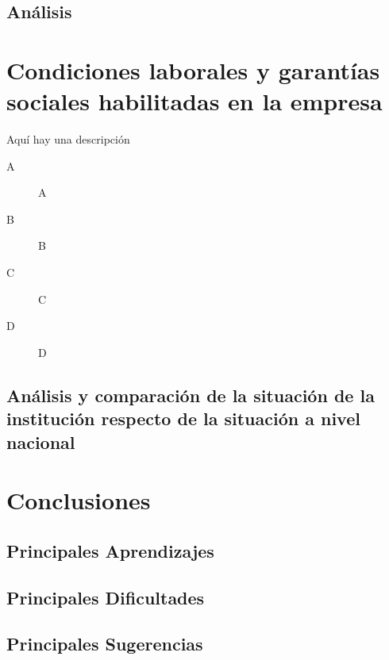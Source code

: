 \documentclass[12pt]{article}
\begin{document}
\subsection{Análisis}



\section{Condiciones laborales y garantías sociales habilitadas en la empresa}

Aquí hay una descripción

\begin{description}
\item[A] A

\item[B] B

\item[C] C

\item[D] D

\end{description}


\subsection{Análisis y comparación de la situación de la institución respecto de la situación a nivel nacional}



\section{Conclusiones}
\subsection{Principales Aprendizajes}



\subsection{Principales Dificultades}


\subsection{Principales Sugerencias}
\end{document}
